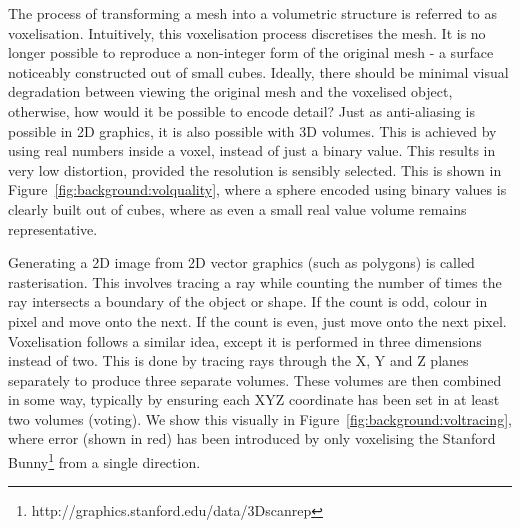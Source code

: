 The process of transforming a mesh into a volumetric structure is
referred to as voxelisation. Intuitively, this voxelisation process
discretises the mesh. It is no longer possible to reproduce a
non-integer form of the original mesh - a surface noticeably
constructed out of small cubes. Ideally, there should be minimal
visual degradation between viewing the original mesh and the voxelised
object, otherwise, how would it be possible to encode detail?  Just as
anti-aliasing is possible in 2D graphics, it is also possible with 3D
volumes. This is achieved by using real numbers inside a voxel,
instead of just a binary value.  This results in very low distortion,
provided the resolution is sensibly selected. This is shown in
Figure~\ref{fig:background:volquality}, where a sphere encoded using
binary values is clearly built out of cubes, where as even a small
real value volume remains representative.

Generating a 2D image from 2D vector graphics (such as polygons) is
called rasterisation. This involves tracing a ray while counting the
number of times the ray intersects a boundary of the object or
shape. If the count is odd, colour in pixel and move onto the next. If
the count is even, just move onto the next pixel. Voxelisation follows
a similar idea, except it is performed in three dimensions instead of
two. This is done by tracing rays through the X, Y and Z planes
separately to produce three separate volumes. These volumes are then
combined in some way, typically by ensuring each XYZ coordinate has
been set in at least two volumes (voting). We show this visually in
Figure~\ref{fig:background:voltracing}, where error (shown in red) has
been introduced by only voxelising the Stanford
Bunny\footnote{http://graphics.stanford.edu/data/3Dscanrep} from a
single direction.

